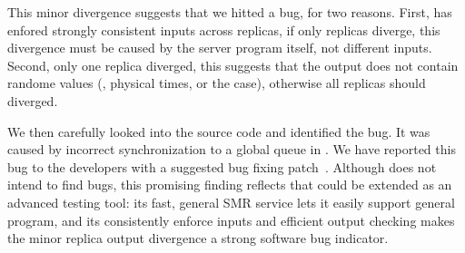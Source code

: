 This minor divergence suggests that we hitted a bug, for two 
reasons. First, \xxx has enfored strongly consistent inputs across replicas, if 
only replicas diverge, this divergence must be caused by the server program 
itself, not different inputs. Second, only one replica diverged, this suggests 
that the output does not contain randome values (\eg, physical times, or the 
\clamav case), otherwise all replicas should diverged.

We then carefully looked into the \ssdb source code and identified the bug. It 
was caused by incorrect synchronization to a global queue in \ssdb. We have 
reported this bug to the \ssdb developers with a suggested bug fixing 
patch~\cite{ssdb:bug}. Although \xxx does not intend to find bugs, this 
promising finding reflects that \xxx could be extended as an advanced testing 
tool: its fast, general SMR service lets it easily support general program, and 
its consistently enforce inputs and efficient output checking makes the minor 
replica output divergence a strong software bug indicator.

% 



 

